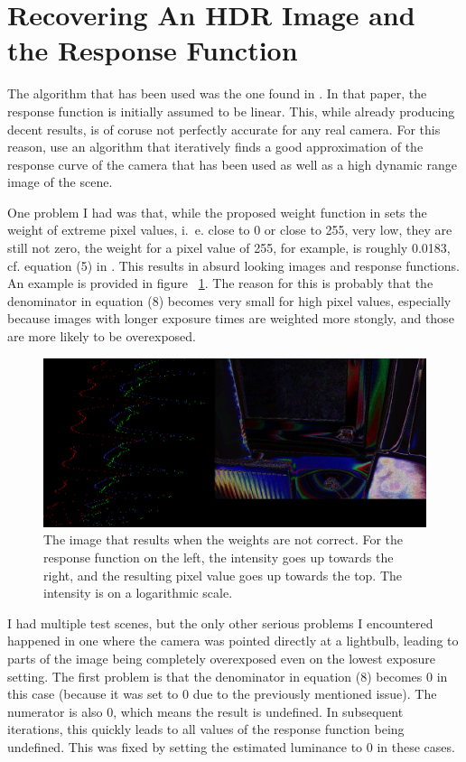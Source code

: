 \section{Recovering An HDR Image and the Response Function}\label{sec:hdr}

The algorithm that has been used was the one found in \cite{rbs99}. In that
paper, the response function is initially assumed to be linear. This, while
already producing decent results, is of coruse not perfectly accurate for any
real camera. For this reason, \cite{rbs99} use an algorithm that iteratively
finds a good approximation of the response curve of the camera that has been
used as well as a high dynamic range image of the scene.

One problem I had was that, while the proposed weight function in \cite{rbs99}
sets the weight of extreme pixel values, i.~e. close to 0 or close to 255, very
low, they are still not zero, the weight for a pixel value of 255, for example,
is roughly 0.0183, cf. equation (5) in \cite{rbs99}. This results in absurd
looking images and response functions. An example is provided in figure~
\ref{fig:wrongweights}. The reason for this is probably that the denominator in
equation (8) becomes very small for high pixel values, especially because
images with longer exposure times are weighted more stongly, and those are more
likely to be overexposed.

\begin{figure}[h]
  \centering
  \includegraphics[width=\textwidth]{wrongweights.png}
  \caption{The image that results when the weights are not correct. For the
  response function on the left, the intensity goes up towards the right, and
  the resulting pixel value goes up towards the top. The intensity is on a
  logarithmic scale.}
  \label{fig:wrongweights}
\end{figure}

I had multiple test scenes, but the only other serious problems I encountered
happened in one where the camera was pointed directly at a lightbulb, leading
to parts of the image being completely overexposed even on the lowest exposure
setting. The first problem is that the denominator in equation (8) becomes 0 in
this case (because it was set to 0 due to the previously mentioned issue). The
numerator is also 0, which means the result is undefined. In subsequent
iterations, this quickly leads to all values of the response function being
undefined. This was fixed by setting the estimated luminance to 0 in these
cases.

